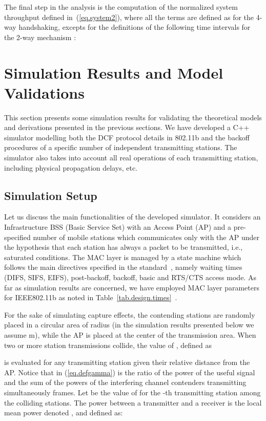 \documentclass[10pt,onecolumn,a4paper]{IEEEtran}
\begin{document}
The final step in the analysis is the computation of the
normalized system throughput defined in~(\ref{eq.system2}), where
all the terms are defined as for the 4-way handshaking, excepts
for the definitions of the following time intervals for the
2-way mechanism \cite{kong}:

\section{Simulation Results and Model Validations}
\label{Simulation_results_section}
This section presents some simulation results for validating the
theoretical models and derivations presented in the previous
sections. We have developed a C++ simulator modelling both the DCF
protocol details in 802.11b and the backoff procedures of a
specific number of independent transmitting stations. The
simulator also takes into account all real operations of each
transmitting station, including physical propagation delays, etc.
\subsection{Simulation Setup}
Let us discuss the main functionalities of the developed
simulator. It considers an Infrastructure BSS (Basic Service Set)
with an Access Point (AP) and a pre-specified number of mobile
stations which communicates only with the AP under the hypothesis
that each station has always a packet to be transmitted, i.e.,
saturated conditions. The MAC layer is managed
by a state machine which follows the main directives specified in
the standard~\cite{standard_DCF_MAC}, namely waiting times (DIFS,
SIFS, EIFS), post-backoff, backoff, basic and RTS/CTS access mode.
As far as simulation results are concerned, we have employed MAC
layer parameters for IEEE802.11b as noted in
Table~\ref{tab.design.times}~\cite{standard_DCF_MAC}.

For the sake of simulating capture effects, the  contending
stations are randomly placed in a circular area of radius  (in
the simulation results presented below we assume m), while
the AP is placed at the center of the transmission area. When two
or more station transmissions collide, the value of ,
defined as

is evaluated for any transmitting station given their relative
distance  from the AP. Notice that  in
(\ref{eq.defgamma}) is the ratio of the power  of the useful
signal and the sum of the powers of the  interfering channel
contenders transmitting simultaneously  frames. Let 
be the value of  for the -th transmitting station among
the  colliding stations. The power between a transmitter and
a receiver is the local mean power denoted , and defined as:
\end{document}
